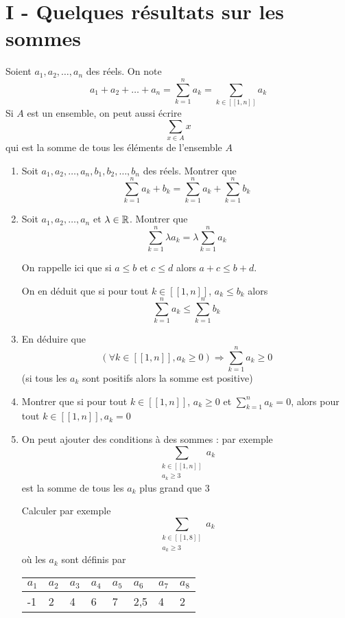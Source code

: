 \section*{I - Quelques résultats sur les sommes}
Soient $a_1,a_2,\ldots,a_n$ des réels. On note 
$$a_1 + a_2 + \ldots + a_n = \sum_{k=1}^n a_k = \sum_{k \in [\![1,n]\!]} a_k$$
Si $A$ est un ensemble, on peut aussi écrire 
$$\sum_{x\in A} x$$ qui est la somme de tous les éléments de l'ensemble $A$
\begin{enumerate}
\item Soit $a_1,a_2,\ldots,a_n,b_1,b_2,\ldots,b_n$ des réels. Montrer que 
$$\sum_{k=1}^n a_k + b_k = \sum_{k=1}^n a_k + \sum_{k=1}^n b_k$$
\item Soit $a_1,a_2,\ldots,a_n$ et $\lambda \in \mathbb{R}$. Montrer que 
$$\sum_{k=1}^n \lambda a_k = \lambda \sum_{k=1}^n a_k $$

On rappelle ici que si $a \leq b$ et $c \leq d$ alors $a+c \leq b+d$. \newline

On en déduit que si pour tout $k \in [\![1,n]\!]$, $a_k \leq b_k$ alors $$\sum_{k=1}^n a_k \leq \sum_{k=1}^n b_k$$
\item En déduire que 
$$\boxed{(\forall k \in [\![1,n]\!], a_k \geq 0 )\Rightarrow \sum_{k=1}^n a_k \geq 0}$$
(si tous les $a_k$ sont positifs alors la somme est positive)
\item Montrer que si pour tout $k \in [\![1,n]\!]$, $a_k \geq 0$ et $\sum_{k=1}^n a_k = 0$, alors pour tout $k\in [\![1,n]\!], a_k = 0$
\item On peut ajouter des conditions à des sommes : par exemple 
$$\sum_{\substack{ k \in [\![1,n]\!] \\ a_k \geq 3}} a_k$$ est la somme de tous les $a_k$ plus grand que 3\newline 

Calculer par exemple $$\sum_{\substack{ k \in [\![1,8]\!] \\ a_k \geq 3}} a_k$$ où les $a_k$ sont définis par \newline

\begin{tabularx}{\linewidth}{|X|X|X|X|X|X|X|X|}
\hline
$a_1$ & $a_2$ & $a_3$ & $a_4$ & $a_5$ & $a_6$ & $a_7$ & $a_8$ \\ \hline
-1 & 2 & 4 & 6 & 7 & 2,5& 4 & 2\\
\hline
\end{tabularx}
\end{enumerate}
